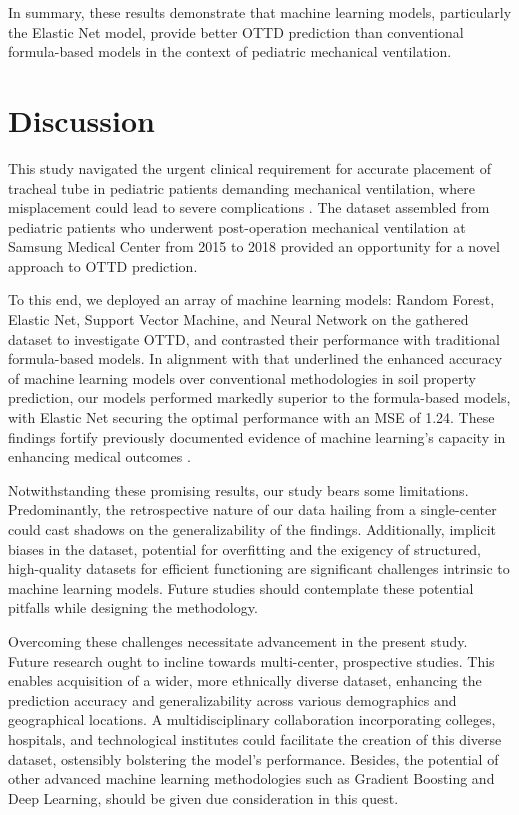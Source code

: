 \documentclass[11pt]{article}
\begin{document}
In summary, these results demonstrate that machine learning models, particularly the Elastic Net model, provide better OTTD prediction than conventional formula-based models in the context of pediatric mechanical ventilation.

\section*{Discussion}

This study navigated the urgent clinical requirement for accurate placement of tracheal tube in pediatric patients demanding mechanical ventilation, where misplacement could lead to severe complications \cite{Seow1985EffectON}. The dataset assembled from pediatric patients who underwent post-operation mechanical ventilation at Samsung Medical Center from 2015 to 2018 provided an opportunity for a novel approach to OTTD prediction.

To this end, we deployed an array of machine learning models: Random Forest, Elastic Net, Support Vector Machine, and Neural Network on the gathered dataset to investigate OTTD, and contrasted their performance with traditional formula-based models. In alignment with \cite{Naimi2021SpatialPO} that underlined the enhanced accuracy of machine learning models over conventional methodologies in soil property prediction, our models performed markedly superior to the formula-based models, with Elastic Net securing the optimal performance with an MSE of 1.24. These findings fortify previously documented evidence of machine learning's capacity in enhancing medical outcomes \cite{Lee2017EffectsOM}.

Notwithstanding these promising results, our study bears some limitations. Predominantly, the retrospective nature of our data hailing from a single-center could cast shadows on the generalizability of the findings. Additionally, implicit biases in the dataset, potential for overfitting and the exigency of structured, high-quality datasets for efficient functioning are significant challenges intrinsic to machine learning models. Future studies should contemplate these potential pitfalls while designing the methodology.

Overcoming these challenges necessitate advancement in the present study. Future research ought to incline towards multi-center, prospective studies. This enables acquisition of a wider, more ethnically diverse dataset, enhancing the prediction accuracy and generalizability across various demographics and geographical locations. A multidisciplinary collaboration incorporating colleges, hospitals, and technological institutes could facilitate the creation of this diverse dataset, ostensibly bolstering the model's performance. Besides, the potential of other advanced machine learning methodologies such as Gradient Boosting and Deep Learning, should be given due consideration in this quest.
\end{document}
